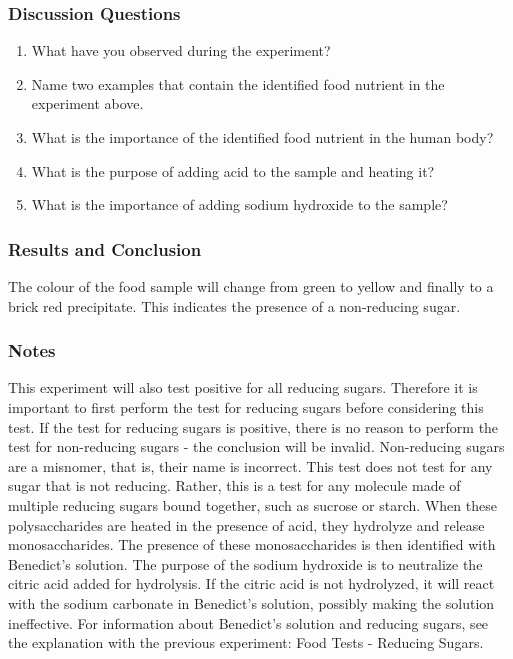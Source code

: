 \subsubsection*{Discussion Questions}
\begin{enumerate}
\item{What have you observed during the experiment?}
\item{Name two examples that contain the identified food nutrient in the experiment above.}
\item{What is the importance of the identified food nutrient in the human body?}
\item{What is the purpose of adding acid to the sample and heating it?}
\item{What is the importance of adding sodium hydroxide to the sample?}
\end{enumerate}

\subsubsection*{Results and Conclusion}
The colour of the food sample will change from green to yellow and finally to a brick red precipitate. This indicates the presence of a non-reducing sugar.

\subsubsection*{Notes}
This experiment will also test positive for all reducing sugars. Therefore it is important to first perform the test for reducing sugars before considering this test. If the test for reducing sugars is positive, there is no reason to perform the test for non-reducing sugars - the conclusion will be invalid.
Non-reducing sugars are a misnomer, that is, their name is incorrect. This test does not test for any sugar that is not reducing. Rather, this is a test for any molecule made of multiple reducing sugars bound together, such as sucrose or starch. When these polysaccharides are heated in the presence of acid, they hydrolyze and release monosaccharides. The presence of these monosaccharides is then identified with Benedict's solution. The purpose of the sodium hydroxide is to neutralize the citric acid added for hydrolysis. If the citric acid is not hydrolyzed, it will react with the sodium carbonate in Benedict's solution, possibly making the solution ineffective.
For information about Benedict's solution and reducing sugars, see the explanation with the previous experiment: Food Tests - Reducing Sugars.

